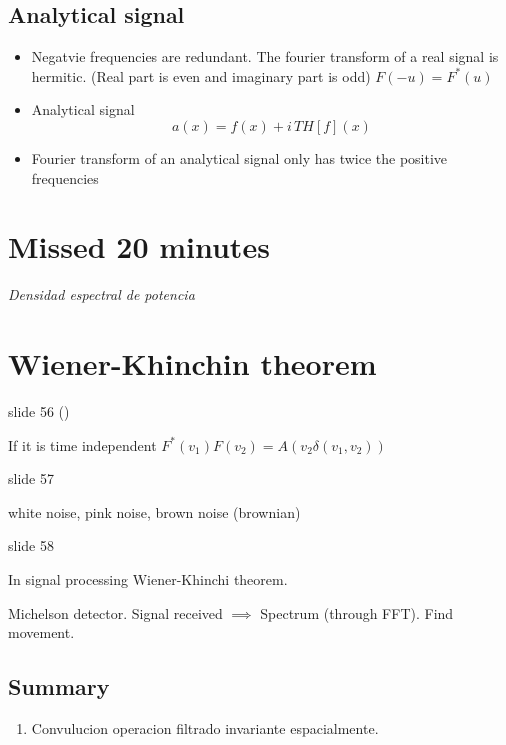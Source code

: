 \documentclass[../main/main.tex]{subfiles}
\begin{document}
\subsection{Analytical signal}

\begin{itemize}
	\item Negatvie frequencies are redundant. The fourier transform of a real signal is hermitic. (Real part is  even and imaginary part is odd) $F(-u)= F^{*}(u)$
	\item Analytical signal
	      \begin{equation}
		      a(x) = f(x) + i \, TH[f](x)
	      \end{equation}
	\item Fourier transform of an analytical signal only has twice the positive frequencies

\end{itemize}

\section{Missed 20 minutes}

\emph{Densidad espectral de potencia}

\section{Wiener-Khinchin theorem}

slide 56 ()

If it is time independent $F^{*}(v_{1})F(v_{2}) = A(v_{2} \delta(v_{1}, v_{2}))$

slide 57

white noise, pink noise, brown noise (brownian)


slide 58

In signal processing Wiener-Khinchi theorem.

Michelson detector.  Signal received $\implies$ Spectrum (through FFT). Find movement.


\subsection{Summary}

\begin{enumerate}
	\item Convulucion operacion filtrado invariante espacialmente.

\end{enumerate}
\end{document}
